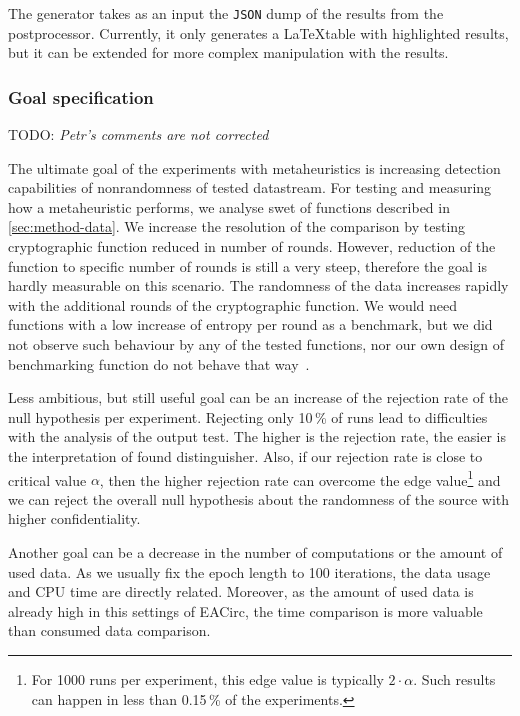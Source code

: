 \documentclass[
  print, %
  Table,   %
  nolof,     %
  nolot,     %
  11pt, %
  oneside  %
]{fithesis3}
\newcommand{\todo}[1]{TODO: \textit{#1}}
\begin{document}
The generator takes as an input the \texttt{JSON} dump of the results from the postprocessor. Currently, it only generates a \LaTeX table with highlighted results, but it can be extended for more complex manipulation with the results.

\subsubsection{Goal specification}
\label{subsubsec:method-spec-ss-goal}

\todo{Petr's comments are not corrected}

The ultimate goal of the experiments with metaheuristics is increasing detection capabilities of nonrandomness of tested datastream. For testing and measuring how a metaheuristic performs, we analyse swet of functions described in \cref{sec:method-data}. We increase the resolution of the comparison by testing cryptographic function reduced in number of rounds. However, reduction of the function to specific number of rounds is still a very steep, therefore the goal is hardly measurable on this scenario. The randomness of the data increases rapidly with the additional rounds of the cryptographic function. We would need functions with a low increase of entropy per round as a benchmark, but we did not observe such behaviour by any of the tested functions, nor our own design of benchmarking function do not behave that way~\cite{EACirc-lut}.

Less ambitious, but still useful goal can be an increase of the rejection rate of the null hypothesis per experiment. Rejecting only 10\,\% of runs lead to difficulties with the analysis of the output test. The higher is the rejection rate, the easier is the interpretation of found distinguisher. Also, if our rejection rate is close to critical value $\alpha$, then the higher rejection rate can overcome the edge value\footnote{For 1000 runs per experiment, this edge value is typically $2\cdot\alpha$. Such results can happen in less than 0.15\,\% of the experiments.} and we can reject the overall null hypothesis about the randomness of the source with higher confidentiality.

Another goal can be a decrease in the number of computations or the amount of used data. As we usually fix the epoch length to 100 iterations, the data usage and CPU time are directly related. Moreover, as the amount of used data is already high in this settings of EACirc, the time comparison is more valuable than consumed data comparison.
\end{document}
